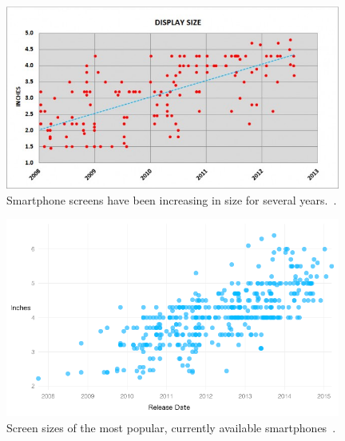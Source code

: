 	\begin{figure}[ht!]
		\centering
		\includegraphics[width=110mm]{images/smartphoneSize2}
		\caption{Smartphone screens have been increasing in size for several years.~\cite{smartphoneSizeChart2}.}
		\label{smartphoneSizeChart2}
	\end{figure}

\hfill

	\begin{figure}[ht!]
		\centering
		\includegraphics[width=110mm]{images/smartphoneSize}
		\caption{Screen sizes of the most popular, currently available smartphones~\cite{smartphoneSizeChart}.}
		\label{smartphoneSizeChart}
	\end{figure}






